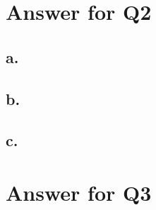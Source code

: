 \documentclass[12pt]{article}
\begin{document}
\section*{Answer for Q2}
\subsection*{a.} 

 \subsection*{b.} 

 \subsection*{c.} 
 


\section*{Answer for Q3}
\end{document}
